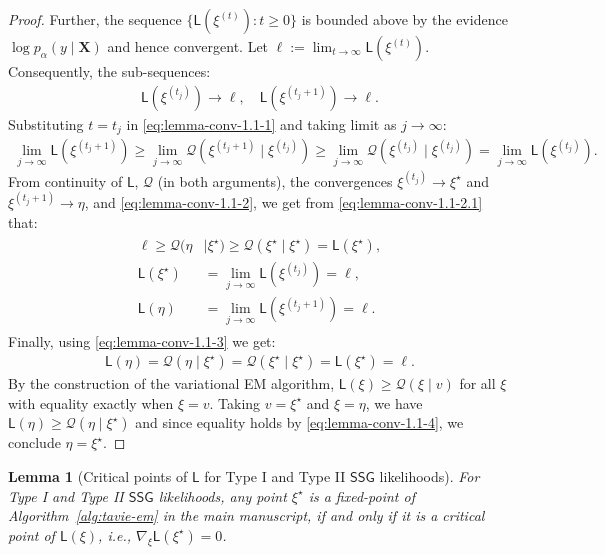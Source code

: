 \documentclass[12pt]{article}
\newtheorem{lemma}{Lemma}[section]
\numberwithin{equation}{section}
\newcommand{\ssg}{\mathsf{SSG}}
\begin{document}
\begin{proof}
Further, the sequence $\{\mathsf{L}(\xi^{(t)}):t\geq 0\}$ is bounded above by the evidence $\log p_{\alpha}(y\mid \mathbf{X})$ and hence convergent. Let $\ell:= \lim_{t\to \infty}\mathsf{L}(\xi^{(t)})$. 
Consequently, the sub-sequences:
\begin{align}\label{eq:lemma-conv-1.1-2}
    \mathsf{L}(\xi^{(t_j)}) \to \ell, \quad \mathsf{L}(\xi^{(t_j+1)}) \to \ell.
\end{align}
Substituting $t=t_j$ in \eqref{eq:lemma-conv-1.1-1} and taking limit as $j\to \infty$:
\begin{align}
\label{eq:lemma-conv-1.1-2.1}
    \lim_{j\to \infty} \mathsf{L}(\xi^{(t_j+1)}) \geq \lim_{j\to\infty}\mathcal{Q}(\xi^{(t_j+1)}\mid \xi^{(t_j)}) \geq \lim_{j\to \infty}\mathcal{Q}(\xi^{(t_j)}\mid \xi^{(t_j)}) = \lim_{j\to \infty}\mathsf{L}(\xi^{(t_j)}).
\end{align}
From continuity of $\mathsf{L}$, $\mathcal{Q}$ (in both arguments), the convergences $\xi^{(t_j)} \to \xi^{\star}$ and $\xi^{(t_j+1)} \to \eta$, and \eqref{eq:lemma-conv-1.1-2}, we get from \eqref{eq:lemma-conv-1.1-2.1} that:
\begin{align}
\begin{split}
\label{eq:lemma-conv-1.1-3}
    \ell \geq \mathcal{Q}(\eta&\mid \xi^{\star}) \geq \mathcal{Q}(\xi^{\star}\mid \xi^{\star}) = \mathsf{L}(\xi^{\star}),\\
\mathsf{L}(\xi^{\star}) &= \lim_{j\to \infty}\mathsf{L}(\xi^{(t_j)}) = \ell,\\
\mathsf{L}(\eta) &= \lim_{j\to \infty}\mathsf{L}(\xi^{(t_j+1)}) = \ell.
\end{split}
\end{align}
Finally, using \eqref{eq:lemma-conv-1.1-3} we get:
\begin{align}
\label{eq:lemma-conv-1.1-4}
    \mathsf{L}(\eta) = \mathcal{Q}(\eta\mid \xi^{\star}) = \mathcal{Q}(\xi^{\star}\mid \xi^{\star}) = \mathsf{L}(\xi^{\star}) = \ell.
\end{align}
By the construction of the variational EM algorithm, $\mathsf{L}(\xi)\geq \mathcal{Q}(\xi\mid v)$ for all $\xi$ with equality exactly when $\xi = v$. Taking $v = \xi^{\star}$ and $\xi = \eta$, we have $\mathsf{L}(\eta) \geq  \mathcal{Q}(\eta\mid \xi^{\star})$ and since equality holds by \eqref{eq:lemma-conv-1.1-4}, we conclude $\eta = \xi^{\star}$.
\end{proof}

\begin{lemma}[Critical points of $\mathsf{L}$ for Type I and Type II $\ssg$ likelihoods]
\label{lemma:critical-point-L}
For Type I and Type II $\ssg$ likelihoods, any point $\xi^{\star}$ is a fixed-point of Algorithm~\ref{alg:tavie-em} in the main manuscript, if and only if it is a critical point of $\mathsf{L}(\xi)$, i.e., $\nabla_{\xi} \mathsf{L}(\xi^{\star}) = 0$. 
\end{lemma}
\end{document}
